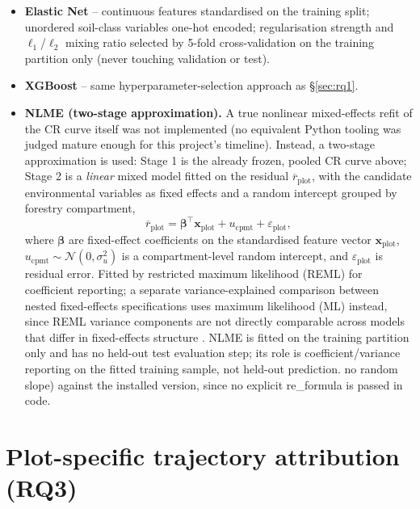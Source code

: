 \documentclass[11pt,a4paper]{report}
\begin{document}
\begin{itemize}
\setlength\itemsep{0pt}
\item \textbf{Elastic Net} -- continuous features standardised on the training split; unordered
  soil-class variables one-hot encoded; regularisation strength and $\ell_1$/$\ell_2$ mixing
  ratio selected by 5-fold cross-validation on the training partition only (never touching
  validation or test).
\item \textbf{XGBoost} -- same hyperparameter-selection approach as \S\ref{sec:rq1}.
\item \textbf{NLME (two-stage approximation).} A true nonlinear mixed-effects refit of the CR
  curve itself was not implemented (no equivalent Python tooling was judged mature enough for
  this project's timeline). Instead, a two-stage approximation is used: Stage 1 is the already
  frozen, pooled CR curve above; Stage 2 is a \emph{linear} mixed model fitted on the residual
  $\overline{r}_{\text{plot}}$, with the candidate environmental variables as fixed effects and a
  random intercept grouped by forestry compartment,
  \begin{equation}
  \overline{r}_{\text{plot}} = \boldsymbol{\beta}^{\top}\mathbf{x}_{\text{plot}} +
  u_{\text{cpmt}} + \varepsilon_{\text{plot}},
  \label{eq:nlme}
  \end{equation}
  where $\boldsymbol{\beta}$ are fixed-effect coefficients on the standardised feature vector
  $\mathbf{x}_{\text{plot}}$, $u_{\text{cpmt}}\sim\mathcal{N}(0,\sigma_u^2)$ is a compartment-level
  random intercept, and $\varepsilon_{\text{plot}}$ is residual error. Fitted by restricted
  maximum likelihood (REML) for coefficient reporting; a separate variance-explained comparison
  between nested fixed-effects specifications uses maximum likelihood (ML) instead, since REML
  variance components are not directly comparable across models that differ in fixed-effects
  structure \citep{pinheiro2000}. %
  NLME is fitted on the training partition only and has no held-out test evaluation step; its
  role is coefficient/variance reporting on the fitted training sample, not held-out prediction.
  no random slope) against the installed version, since no explicit re\_formula is passed in code.
\end{itemize}

\section{Plot-specific trajectory attribution (RQ3)}
\label{sec:rq3}
\end{document}
